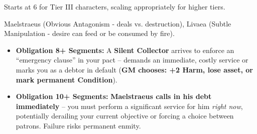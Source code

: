  Starts at 6 for Tier III characters, scaling appropriately for higher tiers.

 Maelstraeus (Obvious Antagonism - deals vs. destruction), Livaea (Subtle Manipulation - desire can feed or be consumed by fire).

\begin{itemize}[leftmargin=*]
    \item \textbf{Obligation 8+ Segments:} A \textbf{Silent Collector} arrives to enforce an ``emergency clause'' in your pact -- demands an immediate, costly service or marks you as a debtor in default (\textbf{GM chooses: +2 Harm, lose asset, or mark permanent Condition}).
    \item \textbf{Obligation 10+ Segments:} \textbf{Maelstraeus calls in his debt immediately} -- you must perform a significant service for him \textit{right now}, potentially derailing your current objective or forcing a choice between patrons. Failure risks permanent enmity.
\end{itemize}
